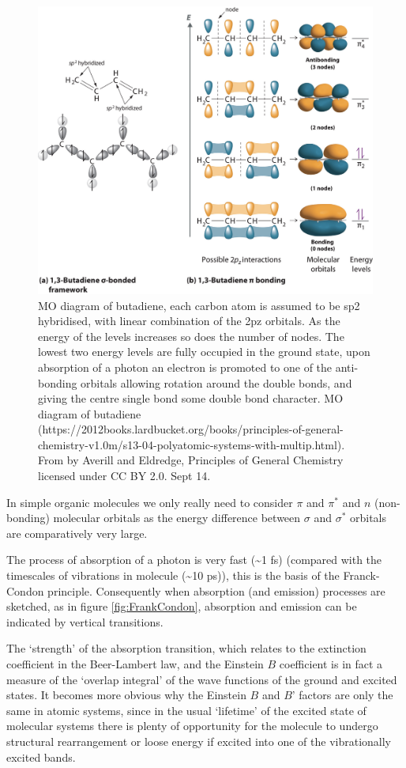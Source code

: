 \documentclass[
]{book}
\begin{document}
\begin{figure}

{\centering \includegraphics[width=0.7\linewidth]{images/Butadiene} 

}

\caption{MO diagram of butadiene, each carbon atom is assumed to be sp2 hybridised, with linear combination of the 2pz orbitals. As the energy of the levels increases so does the number of nodes. The lowest two energy levels are fully occupied in the ground state, upon absorption of a photon an electron is promoted to one of the anti-bonding orbitals allowing rotation around the double bonds, and giving the centre single bond some double bond character. MO diagram of butadiene (https://2012books.lardbucket.org/books/principles-of-general-chemistry-v1.0m/s13-04-polyatomic-systems-with-multip.html). From by Averill and Eldredge, Principles of General Chemistry licensed under CC BY 2.0. Sept 14.}\label{fig:Butadiene}
\end{figure}

In simple organic molecules we only really need to consider \(\pi\) and \(\pi^\ast\) and \(n\) (non-bonding) molecular orbitals as the energy difference between \(\sigma\) and \(\sigma^\ast\) orbitals are comparatively very large.

The process of absorption of a photon is very fast (\textasciitilde1 fs) (compared with the timescales of vibrations in molecule (\textasciitilde10 ps)), this is the basis of the Franck-Condon principle. Consequently when absorption (and emission) processes are sketched, as in figure \ref{fig:FrankCondon}, absorption and emission can be indicated by vertical transitions.

The `strength' of the absorption transition, which relates to the extinction coefficient in the Beer-Lambert law, and the Einstein \(B\) coefficient is in fact a measure of the `overlap integral' of the wave functions of the ground and excited states.
It becomes more obvious why the Einstein \(B\) and \(B’\) factors are only the same in atomic systems, since in the usual `lifetime' of the excited state of molecular systems there is plenty of opportunity for the molecule to undergo structural rearrangement or loose energy if excited into one of the vibrationally excited bands.
\end{document}
